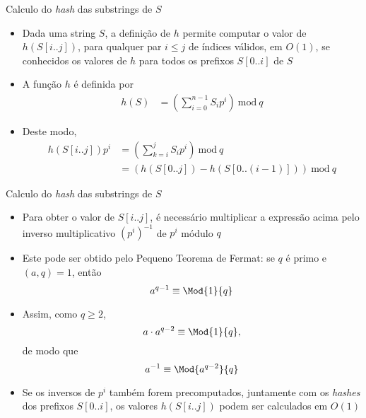 \begin{frame}[fragile]{Calculo do {\it hash} das substrings de $S$}

    \begin{itemize}
        \item Dada uma string $S$, a definição de $h$ permite computar o valor de $h(S[i..j])$,
            para qualquer par $i\leq j$ de índices válidos, em $O(1)$, se conhecidos os valores
            de $h$ para todos os prefixos $S[0..i]$ de $S$
        \pause

        
        \item A função $h$ é definida por
        \begin{align*}
        h(S) &= \left(\sum_{i=0}^{n - 1} S_ip^i\right)\ \mbox{mod}\ q
        \end{align*}
        \pause


        \item Deste modo,
        \begin{align*}
        h(S[i..j])p^i &= \left(\sum_{k=i}^{j} S_ip^i\right)\ \mbox{mod}\ q \\
        &= \left(h(S[0..j]) - h(S[0..(i - 1)])\right) \ \mbox{mod}\ q
        \end{align*}
    \end{itemize}

\end{frame}

\begin{frame}[fragile]{Calculo do {\it hash} das substrings de $S$}

    \begin{itemize}
        \item Para obter o valor de $S[i..j]$, é necessário multiplicar a expressão acima
            pelo inverso multiplicativo $(p^i)^{-1}$ de $p^i$ módulo $q$
        \pause


        \item Este pode ser obtido pelo Pequeno Teorema de Fermat: se $q$ é primo e 
        $(a, q) = 1$, então
        \[
            a^{q-1}\equiv \Mod{1}{q}
        \]
        \pause


        \item Assim, como $q \geq 2$,
        \[
            a\cdot a^{q-2}\equiv \Mod{1}{q},
        \]
        de modo que 
        \[
            a^{-1}\equiv \Mod{a^{q-2}}{q}
        \]
        \pause


        \item Se os inversos de $p^i$ também forem precomputados, juntamente com os 
        \textit{hashes} dos prefixos $S[0..i]$, os valores $h(S[i..j])$ podem ser calculados
        em $O(1)$
    \end{itemize}

\end{frame}

